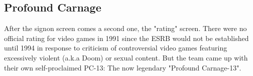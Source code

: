 \documentclass[book.tex]{subfiles}
\begin{document}
\subsection{Profound Carnage}
After the signon screen comes a second one, the "rating" screen. There were no official rating for video games in 1991 since the ESRB would not be established until 1994 in response to criticism of controversial video games featuring excessively violent (a.k.a Doom) or sexual content. But the team came up with their own self-proclaimed PC-13: The now legendary "Profound Carnage-13".\\
\begin{figure}[H]
\centering
{}
\end{figure}
\end{document}
